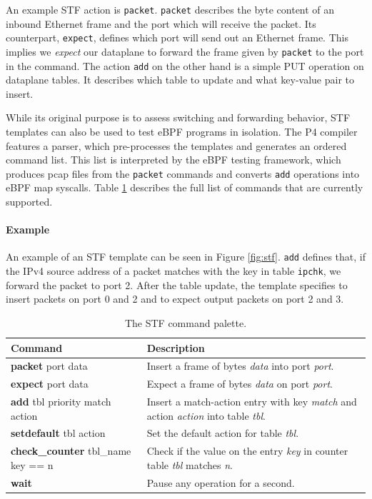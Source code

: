 An example STF action is \texttt{packet}. \texttt{packet} describes the 
byte content of an inbound Ethernet frame and the port which will receive the 
packet.
Its counterpart, \texttt{expect}, defines which port will send out an Ethernet 
frame. This implies we \textit{expect} our dataplane to forward the frame 
given by \texttt{packet} to the port in the command.
The action \texttt{add} on the other hand is a simple PUT operation on 
dataplane tables. It describes which table to update and what key-value pair to 
insert.

While its original purpose is to assess switching and forwarding behavior, STF 
templates can also be used to test eBPF programs in isolation. The P4 compiler 
features a parser, which pre-processes the templates and generates an ordered 
command list. This list is interpreted by the eBPF testing framework, 
which produces pcap files from the \texttt{packet} commands and converts 
\texttt{add} operations into eBPF map syscalls.
Table \ref{table:stf} describes the full list of commands that are currently 
supported.

\paragraph{Example}
An example of an STF template can be seen in Figure \ref{fig:stf}. \texttt{add} 
defines that, if the IPv4 source address of a packet matches with the key in 
table \texttt{ipchk}, we forward the packet to 
port 2. After the table update, the template specifies to insert packets on 
port 0 and 2 and to expect output packets on port 2 and 3.


\begin{table}[h]
	\begin{center}
		\begin{tabular}{|l|p{9cm}|} \hline
			\textbf{Command} & \textbf{Description} \\ \hline \hline
			\textbf{packet} port data & Insert a frame of bytes
			\textit{data} into port \textit{port}.    \\ \hline
			\textbf{expect} port data & Expect a frame of bytes
			\textit{data} on port \textit{port}.  \\ \hline
			\textbf{add} tbl priority match action & Insert a
			match-action entry with key \textit{match} and action
			\textit{action} into table \textit{tbl}. \\ \hline
			\textbf{setdefault} tbl action & Set the default action for table
			\textit{tbl}. \\
			\hline
			\textbf{check\_counter} tbl\_name key == n & Check if the value on
			the entry \textit{key} in counter table \textit{tbl} matches
			\textit{n}.  \\
			\hline
			\textbf{wait} & Pause any operation for a second. \\ \hline
		\end{tabular}
		\caption{The STF command palette.}\label{table:stf}
	\end{center}
\end{table}

